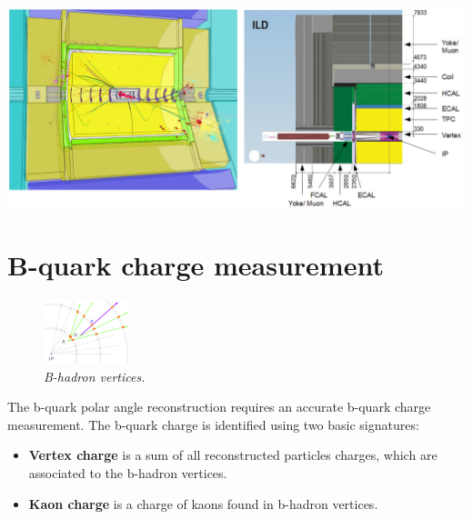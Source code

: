 \begin{center}\vspace{3.cm}
	\centering
	
	\includegraphics[width=0.9\linewidth]{figures/ild2.png}
	\label{fig:ILDScheme}
\end{center}\vspace{1cm}

\color{DarkSlateGray} %

\section*{B-quark charge measurement}
\setlength{\columnsep}{20pt}%
\begin{figure}
	
	\includegraphics[width=0.22\textwidth]{figures/vtx.pdf}
	\caption{\sl B-hadron vertices.}
	\label{fig:vtx}

\end{figure}

\color{Blue}
The b-quark polar angle reconstruction requires an accurate b-quark charge measurement. 
The b-quark charge is identified using two basic signatures:
\begin{itemize}
	\item \textbf{Vertex charge} is a sum of all reconstructed particles charges, which are associated to the b-hadron vertices. 
	\item \textbf{Kaon charge} is a charge of kaons found in b-hadron vertices. 
\end{itemize}

